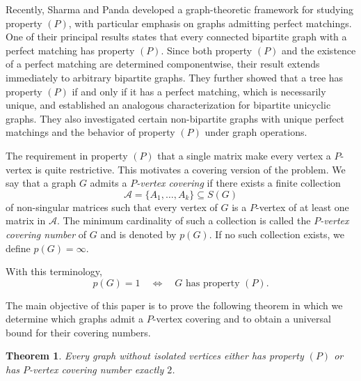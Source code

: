 \documentclass[12pt,reqno]{amsart}
\theoremstyle{plain}
\newtheorem*{thm}{Theorem}
\theoremstyle{definition}
\theoremstyle{block}
\theoremstyle{remark}
\numberwithin{equation}{section}
\begin{document}
Recently, Sharma and Panda \cite{sharma} developed a graph-theoretic
framework for studying property \((P)\), with particular emphasis on
graphs admitting perfect matchings. One of their principal results
states that every connected bipartite graph with a perfect matching
has property \((P)\). Since both property \((P)\) and the existence of
a perfect matching are determined componentwise, their result extends
immediately to arbitrary bipartite graphs. They further showed that a
tree has property \((P)\) if and only if it has a perfect matching,
which is necessarily unique, and established an analogous
characterization for bipartite unicyclic graphs. They also investigated
certain non-bipartite graphs with unique perfect matchings and the
behavior of property \((P)\) under graph operations.

The requirement in property \((P)\) that a single matrix make every
vertex a \(P\)-vertex is quite restrictive. This motivates a covering
version of the problem. We say that a graph \(G\) admits a
\emph{\(P\)-vertex covering} if there exists a finite collection
\[
\mathcal A=\{A_1,\ldots,A_k\}\subseteq S(G)
\]
of non-singular matrices such that every vertex of \(G\) is a
\(P\)-vertex of at least one matrix in \(\mathcal A\). The minimum
cardinality of such a collection is called the
\emph{\(P\)-vertex covering number} of \(G\) and is denoted by \(p(G)\).
If no such collection exists, we define
\(
p(G)=\infty.
\)

\noindent With this terminology,
\[
p(G)=1
\quad\Longleftrightarrow\quad
G\text{ has property }(P).
\]


The main objective of this paper is to prove the following theorem in which we determine which graphs admit a
\(P\)-vertex covering and to obtain a universal bound for their
covering numbers. 

\begin{thm}
 Every graph without isolated vertices either has property
\((P)\) or has \(P\)-vertex covering number exactly \(2\).  
\end{thm}



\end{document}
